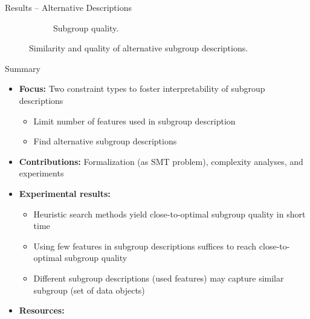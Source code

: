 \documentclass[en, navbaroff]{sdqbeamer}
\begin{document}
\begin{frame}[t]{Results -- Alternative Descriptions}
\begin{figure}
\begin{subfigure}[t]{0.4\textwidth}
			\caption{Subgroup quality.}
			\label{fig:csd:alternatives-train-nwracc}
		\end{subfigure}
		\caption*{
			Similarity and quality of alternative subgroup descriptions.
		}
		\label{fig:csd:alternatives:main}
	\end{figure}
\end{frame}

\begin{frame}[t]{Summary}
	\begin{itemize}
		\item \textbf{Focus:} Two constraint types to foster interpretability of subgroup descriptions
		\begin{itemize}
			\item Limit number of features used in subgroup description
			\item Find alternative subgroup descriptions
		\end{itemize}
		\pause
		\vspace{\baselineskip}
		\item \textbf{Contributions:} Formalization (as SMT problem), complexity analyses, and experiments
		\pause
		\vspace{\baselineskip}
		\item \textbf{Experimental results:}
		\begin{itemize}
			\item Heuristic search methods yield close-to-optimal subgroup quality in short time
			\item Using few features in subgroup descriptions suffices to reach close-to-optimal subgroup quality
			\item Different subgroup descriptions (used features) may capture similar subgroup (set of data objects)
		\end{itemize}
		\pause
		\vspace{\baselineskip}
		\item \textbf{Resources:}

\end{itemize}
\end{frame}
\end{document}
